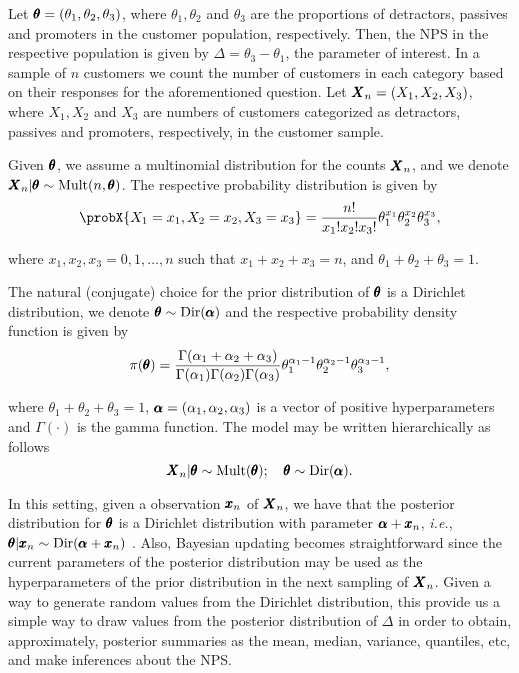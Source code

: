 \documentclass[12pt,a4paper]{article}%
\newcommand*{\bff}[1]{\ifmmode\pmb{#1}\else\textbf{#1}\fi}
\begin{document}
Let $\bff{\theta}=(\theta_1,\theta_2,\theta_3)$, where $\theta_1, \theta_2$ and $\theta_3$ are the proportions of detractors, passives and promoters in the customer population, respectively. Then, the NPS in the respective population is given by $\Delta=\theta_3-\theta_1$, the parameter of interest. In a sample of $n$ customers we count the number of customers in each category based on their responses for the aforementioned question. Let $\bff{X}_n=(X_1,X_2,X_3)$, where $X_1, X_2$ and $X_3$ are numbers of customers categorized as detractors, passives and promoters, respectively, in the customer sample.

Given $\bff{\theta}$, we assume a multinomial distribution for the counts $\bff{X}_n$, and we denote $\bff{X}_n|\bff{\theta}\sim\text{Mult}(n, \bff{\theta})$. The respective probability distribution is given by
%
$$\probX{X_1=x_1,X_2=x_2,X_3=x_3}=\frac{n!}{x_1!x_2!x_3!}\theta_1^{x_1}\theta_2^{x_2}\theta_3^{x_3},$$

\noindent
where $x_1,x_2,x_3=0,1,\ldots, n$ such that $x_1+x_2+x_3=n$, and $\theta_1+\theta_2+\theta_3=1$.

The natural (conjugate) choice for the prior distribution of $\bff{\theta}$ is a Dirichlet distribution, we denote $\bff{\theta}\sim\text{Dir}(\bff{\alpha})$ and the respective probability density function is given by
%
$$\pi(\bff{\theta})=\frac{\Gamma(\alpha_1+\alpha_2+\alpha_3)}{\Gamma(\alpha_1)\Gamma(\alpha_2)\Gamma(\alpha_3)}\theta_1^{\alpha_1-1}\theta_2^{\alpha_2-1}\theta_3^{\alpha_3-1},$$

\noindent
where $\theta_1+\theta_2+\theta_3=1$, $\bff{\alpha}=(\alpha_1, \alpha_2, \alpha_3)$ is a vector of positive hyperparameters and $\Gamma(\cdot)$ is the gamma function. The model may be written hierarchically as follows
%
\begin{equation}
 \bff{X}_n|\bff{\theta}\sim \text{Mult}(\bff{\theta});\quad
 \bff{\theta}\sim \text{Dir}(\bff{\alpha}).
\end{equation}

%
In this setting, given a observation $\bff{x}_n$ of $\bff{X}_n$, we have that the posterior distribution for $\bff{\theta}$ is a Dirichlet distribution with parameter $\bff{\alpha}+\bff{x}_n$, {\it i.e.}, $\bff{\theta}|\bff{x}_n\sim\text{Dir}(\bff{\alpha}+\bff{x}_n)$ \citep{Turkmanetal2019}. Also, Bayesian updating becomes straightforward since the current parameters of the posterior distribution may be used as the hyperparameters of the prior distribution in the next sampling of $\bff{X}_n$. Given a way to generate random values from the Dirichlet distribution, this provide us a simple way to draw values from the posterior distribution of $\Delta$ in order to obtain, approximately, posterior summaries as the mean, median, variance, quantiles, etc, and make inferences about the NPS.
\end{document}

